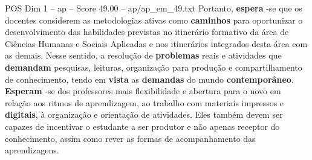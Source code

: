 \begin{textsample}{POS Dim 1 – ap – Score 49.00 – ap/ap\_em\_49.txt}
Portanto, \textbf{espera} -se que os docentes considerem as metodologias ativas como \textbf{caminhos} para oportunizar o desenvolvimento das habilidades previstas no itinerário formativo da área de Ciências Humanas e Sociais Aplicadas e nos itinerários integrados desta área com as demais.
Nesse sentido, a resolução de \textbf{problemas} reais e atividades que \textbf{demandam} pesquisas, leituras, organização para produção e compartilhamento de conhecimento, tendo em \textbf{vista} as \textbf{demandas} do mundo \textbf{contemporâneo}. \textbf{Esperam} -se dos professores mais flexibilidade e abertura para o novo em relação aos ritmos de aprendizagem, ao trabalho com materiais impressos e \textbf{digitais}, à organização e orientação de atividades.
Eles também devem ser capazes de incentivar o estudante a ser produtor e não apenas receptor do conhecimento, assim como rever as formas de acompanhamento das aprendizagens.

\end{textsample}
